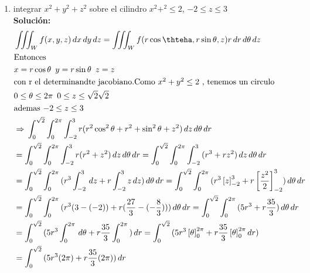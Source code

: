 \documentclass[10pt,letterpaper,fleqn]{article}
\begin{document}
\begin{enumerate}
        \item integrar $x^2+y^2+z^2$  sobre el cilindro $x^2+^2 \leq 2 $, $ -2\leq z \leq 3$
    	\\ \textbf{Solución:}
            	\begin{equation*}
                \begin{split}
                        & 
                        \iiint_W{f(x,y,z) \,d x \,d y \,d z}
                        = \iiint_W{f(r \cos{ \thteha} , r \sin{\theta},z)r \, d r \,d\theta \,dz}
                        \\& \mbox{Entonces}
                        \\& x= r \cos{\theta} \,\,\, y = r \sin{\theta} \,\,\, z =z
                        \\& \mbox{con r el determinandte jacobiano.}
                        \mbox{Como $x^2+y^2 \leq 2$ , tenemos un circulo  }
                        \\&  0 \leq \theta \leq 2\pi \,\,\, 0 \leq z \leq \sqrt{2} \sqrt{2}
                        \\& \mbox{ademas $ -2\leq z \leq 3$ }
                        \\& \Rightarrow\,\int_0^{\sqrt{2}}{\int_0^{2\pi}{ \int_{-2}^{3}{ r(r^2 \cos^2 \theta + r^2 + \sin ^2 \theta +z^2)}} }\,dz\,d\theta\,dr
                        \\& = \int_0^{\sqrt{2}}{\int_0^{2\pi}{ \int_{-2}^{3}{ r( r^2 + z^2 )}} }\,dz\,d\theta\,d r
                        = \int_0^{\sqrt{2}}{\int_0^{2\pi}{ \int_{-2}^{3}{ (r^3 + r z^2 )}} }\,dz\,d\theta\,d r
                        \\&= \int_0^{\sqrt{2}}{\int_0^{2\pi}{ (r^3\int_{-2}^{3} \, dz +r\int_{-2}^{3}{z} \,dz)} }\,d\theta\, d r
                        = \int_0^{\sqrt{2}}{\int_0^{2\pi}{( r^3 \left[z\right]_{-2}^3 + r \left[\frac{z^2}{2}\right]_{-2}^3} )}\,d\theta\,d r
                        \\& = \int_0^{\sqrt{2}} {\int_0^{2\pi}{ (r^3 (3-(-2))+ r (\frac{27}{3} - (-\frac{8}{3}) ) } )}\,d\theta\,d r
                        = \int_0^{\sqrt{2}}{\int_0^{2\pi}{ (5 r^3 +r\frac{35}{3}}) }\,d\theta\,d r
                        \\&= \int_0^{\sqrt{2}}{( 5r^3 \int_0^{2\pi}{  } \,d\theta + r \frac{35}{3} \int_0^{2\pi}{ } )}\,d r
                        = \int_0^{\sqrt{2}}{ ( 5r^3 \left[\theta\right]_{0}^{2\pi} + r \frac{35}{3} \left[\theta\right]_{0}^{2\pi}}\,d r)
                        \\&= \int_0^{\sqrt{2}}{ (5r^3 (2\pi)  + r \frac{35}{3} (2\pi))}\,d r

\end{split}
\end{equation*}
\end{enumerate}
\end{document}
